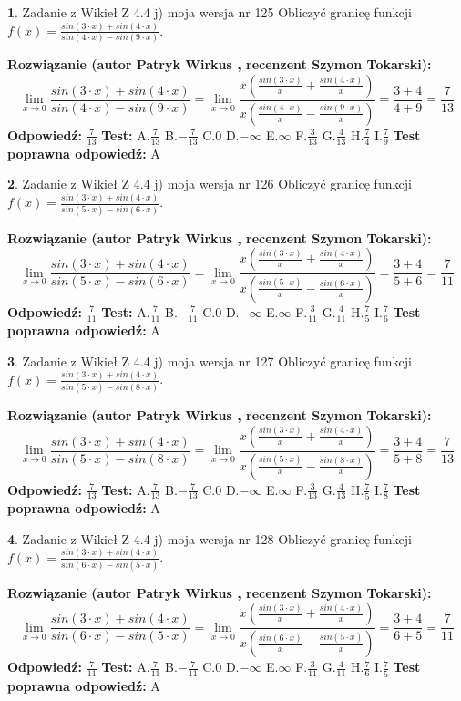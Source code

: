 \documentclass[12pt, a4paper]{article}
\theoremstyle{definition} %
\newtheorem{zad}{}
\newcommand{\zadStart}[1]{\begin{zad}#1\newline}
\newcommand{\zadStop}{\end{zad}}
\newcommand{\rozwStart}[2]{\noindent \textbf{Rozwiązanie (autor #1 , recenzent #2): }\newline}
\newcommand{\rozwStop}{\newline}
\newcommand{\odpStart}{\noindent \textbf{Odpowiedź:}\newline}
\newcommand{\odpStop}{\newline}
\newcommand{\testStart}{\noindent \textbf{Test:}\newline}
\newcommand{\testStop}{\newline}
\newcommand{\kluczStart}{\noindent \textbf{Test poprawna odpowiedź:}\newline}
\newcommand{\kluczStop}{\newline}
\begin{document}
\zadStart{Zadanie z Wikieł Z 4.4 j) moja wersja nr 125}
Obliczyć granicę funkcji $f(x)=\frac{sin(3\cdot x) +sin(4\cdot x)}{sin(4\cdot x) -sin(9\cdot x)}$.
\zadStop
\rozwStart{Patryk Wirkus}{Szymon Tokarski}
$$\lim\limits_{x\to 0}\frac{sin(3\cdot x) +sin(4\cdot x)}{sin(4\cdot x) -sin(9\cdot x)}=\lim\limits_{x\to 0}\frac{x(\frac{sin(3\cdot x)}{x}+\frac{sin(4\cdot x)}{x})}{x(\frac{sin(4\cdot x)}{x}-\frac{sin(9\cdot x)}{x})}=\frac{3+4}{4+9} = \frac{7}{13}$$
\rozwStop
\odpStart
$\frac{7}{13}$
\odpStop
\testStart
A.$\frac{7}{13}$
B.$-\frac{7}{13}$
C.$0$
D.$-\infty$
E.$\infty$
F.$\frac{3}{13}$
G.$\frac{4}{13}$
H.$\frac{7}{4}$
I.$\frac{7}{9}$
\testStop
\kluczStart
A
\kluczStop



\zadStart{Zadanie z Wikieł Z 4.4 j) moja wersja nr 126}
Obliczyć granicę funkcji $f(x)=\frac{sin(3\cdot x) +sin(4\cdot x)}{sin(5\cdot x) -sin(6\cdot x)}$.
\zadStop
\rozwStart{Patryk Wirkus}{Szymon Tokarski}
$$\lim\limits_{x\to 0}\frac{sin(3\cdot x) +sin(4\cdot x)}{sin(5\cdot x) -sin(6\cdot x)}=\lim\limits_{x\to 0}\frac{x(\frac{sin(3\cdot x)}{x}+\frac{sin(4\cdot x)}{x})}{x(\frac{sin(5\cdot x)}{x}-\frac{sin(6\cdot x)}{x})}=\frac{3+4}{5+6} = \frac{7}{11}$$
\rozwStop
\odpStart
$\frac{7}{11}$
\odpStop
\testStart
A.$\frac{7}{11}$
B.$-\frac{7}{11}$
C.$0$
D.$-\infty$
E.$\infty$
F.$\frac{3}{11}$
G.$\frac{4}{11}$
H.$\frac{7}{5}$
I.$\frac{7}{6}$
\testStop
\kluczStart
A
\kluczStop



\zadStart{Zadanie z Wikieł Z 4.4 j) moja wersja nr 127}
Obliczyć granicę funkcji $f(x)=\frac{sin(3\cdot x) +sin(4\cdot x)}{sin(5\cdot x) -sin(8\cdot x)}$.
\zadStop
\rozwStart{Patryk Wirkus}{Szymon Tokarski}
$$\lim\limits_{x\to 0}\frac{sin(3\cdot x) +sin(4\cdot x)}{sin(5\cdot x) -sin(8\cdot x)}=\lim\limits_{x\to 0}\frac{x(\frac{sin(3\cdot x)}{x}+\frac{sin(4\cdot x)}{x})}{x(\frac{sin(5\cdot x)}{x}-\frac{sin(8\cdot x)}{x})}=\frac{3+4}{5+8} = \frac{7}{13}$$
\rozwStop
\odpStart
$\frac{7}{13}$
\odpStop
\testStart
A.$\frac{7}{13}$
B.$-\frac{7}{13}$
C.$0$
D.$-\infty$
E.$\infty$
F.$\frac{3}{13}$
G.$\frac{4}{13}$
H.$\frac{7}{5}$
I.$\frac{7}{8}$
\testStop
\kluczStart
A
\kluczStop



\zadStart{Zadanie z Wikieł Z 4.4 j) moja wersja nr 128}
Obliczyć granicę funkcji $f(x)=\frac{sin(3\cdot x) +sin(4\cdot x)}{sin(6\cdot x) -sin(5\cdot x)}$.
\zadStop
\rozwStart{Patryk Wirkus}{Szymon Tokarski}
$$\lim\limits_{x\to 0}\frac{sin(3\cdot x) +sin(4\cdot x)}{sin(6\cdot x) -sin(5\cdot x)}=\lim\limits_{x\to 0}\frac{x(\frac{sin(3\cdot x)}{x}+\frac{sin(4\cdot x)}{x})}{x(\frac{sin(6\cdot x)}{x}-\frac{sin(5\cdot x)}{x})}=\frac{3+4}{6+5} = \frac{7}{11}$$
\rozwStop
\odpStart
$\frac{7}{11}$
\odpStop
\testStart
A.$\frac{7}{11}$
B.$-\frac{7}{11}$
C.$0$
D.$-\infty$
E.$\infty$
F.$\frac{3}{11}$
G.$\frac{4}{11}$
H.$\frac{7}{6}$
I.$\frac{7}{5}$
\testStop
\kluczStart
A
\kluczStop
\end{document}
